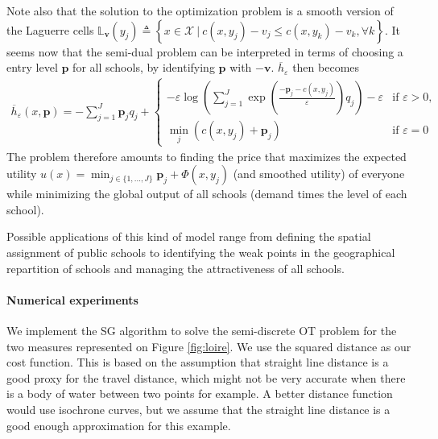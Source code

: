 Note also that the solution to the optimization problem is a smooth version of the Laguerre cells $\mathbb{L}_{\bm{v}}(y_j) \triangleq \left\{ x\in\mathcal{X}\ | \ c(x,y_j) - v_j \leq c(x, y_k) - v_k, \forall k \right\}$. It seems now that the semi-dual problem can be interpreted in terms of choosing a entry level $\mathbf{p}$ for all schools, by identifying $\mathbf{p}$ with $-\bm{v}$. $\overline{h}_\varepsilon$ then becomes 
\begin{align*}
    \overline{h}_\varepsilon(x, \mathbf{p}) = -\sum_{j=1}^J \mathbf{p}_j q_j + 
    \begin{cases}
        -\varepsilon\log\left( \sum_{j=1}^J \exp\left(\frac{-\mathbf{p}_j - c(x, y_j)}{\varepsilon}\right)q_j \right) - \varepsilon & \text{if }\varepsilon > 0,\\
        \min_j (c(x, y_j) + \mathbf{p}_j) & \text{if }\varepsilon = 0
    \end{cases}
\end{align*}
The problem therefore amounts to finding the price that maximizes the expected utility $u(x) = \min_{j\in\{1, ..., J\}} {\mathbf{p}_j + \Phi(x, y_j)}$ (and smoothed utility) of everyone while minimizing the global output of all schools (demand times the level of each school).

Possible applications of this kind of model range from defining the spatial assignment of public schools to identifying the weak points in the geographical repartition of schools and managing the attractiveness of all schools. 

\paragraph{Numerical experiments}

We implement the SG algorithm to solve the semi-discrete OT problem for the two measures represented on Figure \ref{fig:loire}. We use the squared distance as our cost function. This is based on the assumption that straight line distance is a good proxy for the travel distance, which might not be very accurate when there is a body of water between two points for example. A better distance function would use isochrone curves, but we assume that the straight line distance is a good enough approximation for this example. 

